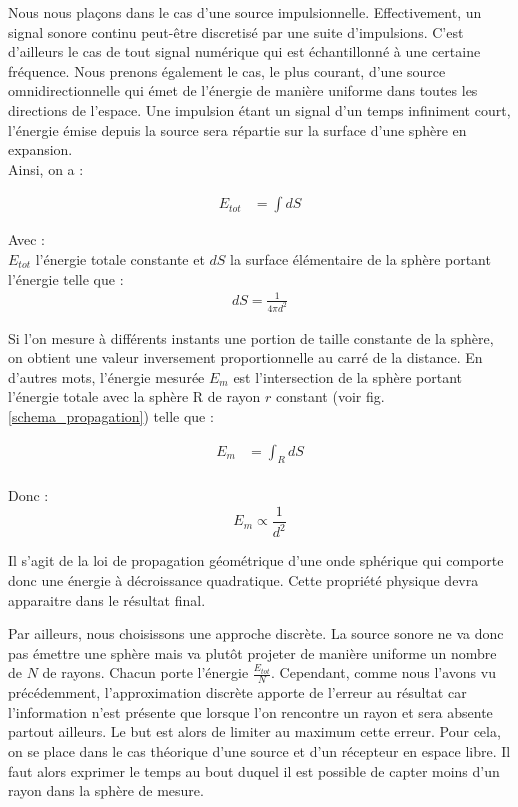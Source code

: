Nous nous plaçons dans le cas d'une source impulsionnelle. Effectivement, un signal sonore continu peut-être discretisé par une suite d'impulsions. C'est d'ailleurs le cas de tout signal numérique qui est échantillonné à une certaine fréquence. Nous prenons également le cas, le plus courant, d'une source omnidirectionnelle qui émet de l'énergie de manière uniforme dans toutes les directions de l'espace. Une impulsion étant un signal d'un temps infiniment court, l'énergie émise depuis la source sera répartie sur la surface d'une sphère en expansion. \\

Ainsi, on a :

\begin{align}
   	E_{tot} &=  \int{dS}
\end{align}

Avec	: \\
$E_{tot}$ l'énergie totale constante et $dS$ la surface élémentaire de la sphère portant l'énergie telle que :\\
\begin{align}
	dS = \frac{1}{4\pi d^2}
\end{align}


Si l'on mesure à différents instants une portion de taille constante de la sphère, on obtient une valeur inversement proportionnelle au carré de la distance. En d'autres mots, l'énergie mesurée $E_m$ est l'intersection de la sphère portant l'énergie totale avec la sphère R de rayon $r$ constant (voir fig. \ref{schema_propagation}) telle que :

\begin{align}
	E_m & = \int_{R}{dS}\\
\end{align}


Donc :
\begin{equation}
	E_m \propto \frac{1}{d^2}
\end{equation}


Il s'agit de la loi de propagation géométrique d'une onde sphérique qui comporte donc une énergie à décroissance quadratique. Cette propriété physique devra apparaitre dans le résultat final.

Par ailleurs, nous choisissons une approche discrète. La source sonore ne va donc pas émettre une sphère mais va plutôt projeter de manière uniforme un nombre de $N$ de rayons. Chacun porte l'énergie $\frac{E_{tot}}{N}$. Cependant, comme nous l'avons vu précédemment, l'approximation discrète apporte de l'erreur au résultat car l'information n'est présente que lorsque l'on rencontre un rayon et sera absente partout ailleurs. Le but est alors de limiter au maximum cette erreur. Pour cela, on se place dans le cas théorique d'une source et d'un récepteur en espace libre. Il faut alors exprimer le temps au bout duquel il est possible de capter moins d'un rayon dans la sphère de mesure. 

